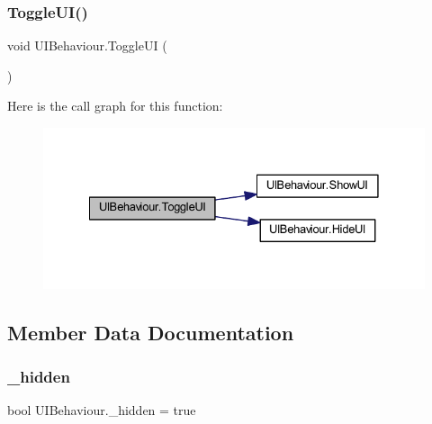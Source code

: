 \subsubsection{\texorpdfstring{ToggleUI()}{ToggleUI()}}
{\footnotesize\ttfamily void U\+I\+Behaviour.\+Toggle\+UI (\begin{DoxyParamCaption}{ }\end{DoxyParamCaption})}

Here is the call graph for this function\+:\nopagebreak
\begin{figure}[H]
\begin{center}
\leavevmode
\includegraphics[width=328pt]{class_u_i_behaviour_a508b07927b86c1f75ab1eeb45674f040_cgraph}
\end{center}
\end{figure}


\subsection{Member Data Documentation}
\mbox{\label{class_u_i_behaviour_a0421d4dc2987f0c48b88cc6175d993e5}} 
\subsubsection{\texorpdfstring{\_hidden}{\_hidden}}
{\footnotesize\ttfamily bool U\+I\+Behaviour.\+\_\+hidden = true\hspace{0.3cm}{\ttfamily [protected]}}

